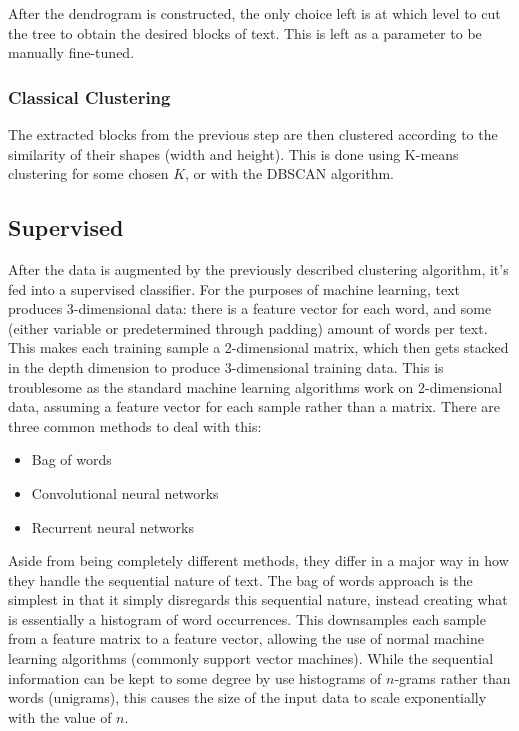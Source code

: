 After the dendrogram is constructed, the only choice left is at which level to
cut the tree to obtain the desired blocks of text. This is left as a parameter
to be manually fine-tuned.

\subsubsection{Classical Clustering}
The extracted blocks from the previous step are then clustered according to
the similarity of their shapes (width and height). This is done using K-means
clustering for some chosen $K$, or with the DBSCAN algorithm.

\subsection{Supervised}

After the data is augmented by the previously described clustering algorithm,
it's fed into a supervised classifier. For the purposes of machine learning,
text produces 3-dimensional data: there is a feature vector for each word, and
some (either variable or predetermined through padding) amount of words per
text. This makes each training sample a 2-dimensional matrix, which then gets
stacked in the depth dimension to produce 3-dimensional training data. This is
troublesome as the standard machine learning algorithms work on 2-dimensional
data, assuming a feature vector for each sample rather than a matrix. There are
three common methods to deal with this:
\begin{itemize}
\item Bag of words
\item Convolutional neural networks
\item Recurrent neural networks
\end{itemize}

Aside from being completely different methods, they differ in a major way in how
they handle the sequential nature of text. The bag of words approach is the
simplest in that it simply disregards this sequential nature, instead creating
what is essentially a histogram of word occurrences. This downsamples each
sample from a feature matrix to a feature vector, allowing the use of normal
machine learning algorithms (commonly support vector machines). While the
sequential information can be kept to some degree by use histograms of $n$-grams
rather than words (unigrams), this causes the size of the input data to scale
exponentially with the value of $n$.


